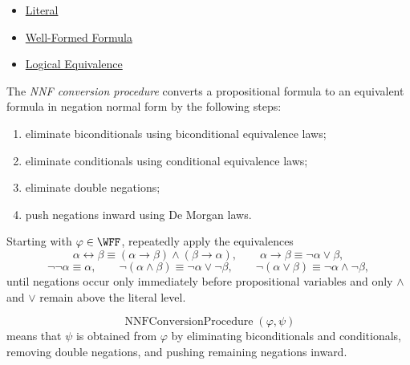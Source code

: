 \begin{dependencies}
\begin{itemize}
  \item \hyperref[def:literal-propositional-logic]{Literal}
  \item \hyperref[def:well-formed-formula]{Well-Formed Formula}
  \item \hyperref[def:logical-equivalence-propositional-logic]{Logical Equivalence}
\end{itemize}
\end{dependencies}

\begin{tcolorbox}[colback=propbox, colframe=propborder, arc=2pt,
  left=6pt, right=6pt, top=4pt, bottom=4pt,
  title={\small\textbf{Definition (NNF Conversion Procedure)}},
  fonttitle=\small\bfseries]
\begin{definition}
\label{def:nnf-conversion-procedure-propositional-logic}
The \emph{NNF conversion procedure} converts a propositional formula to an
equivalent formula in negation normal form by the following steps:
\begin{enumerate}
\item eliminate biconditionals using biconditional equivalence laws;
\item eliminate conditionals using conditional equivalence laws;
\item eliminate double negations;
\item push negations inward using De Morgan laws.
\end{enumerate}
\end{definition}
\end{tcolorbox}

\begin{remark*}
Starting with \(\varphi\in\WFF\), repeatedly apply the equivalences
\[
\alpha\leftrightarrow\beta
\equiv
(\alpha\to\beta)\land(\beta\to\alpha),
\qquad
\alpha\to\beta\equiv\neg\alpha\lor\beta,
\]
\[
\neg\neg\alpha\equiv\alpha,
\qquad
\neg(\alpha\land\beta)\equiv\neg\alpha\lor\neg\beta,
\qquad
\neg(\alpha\lor\beta)\equiv\neg\alpha\land\neg\beta,
\]
until negations occur only immediately before propositional variables and only
\(\land\) and \(\lor\) remain above the literal level.
\end{remark*}

\begin{remark*}
\[
\operatorname{NNFConversionProcedure}(\varphi,\psi)
\]
means that \(\psi\) is obtained from \(\varphi\) by eliminating
biconditionals and conditionals, removing double negations, and pushing
remaining negations inward.
\end{remark*}

